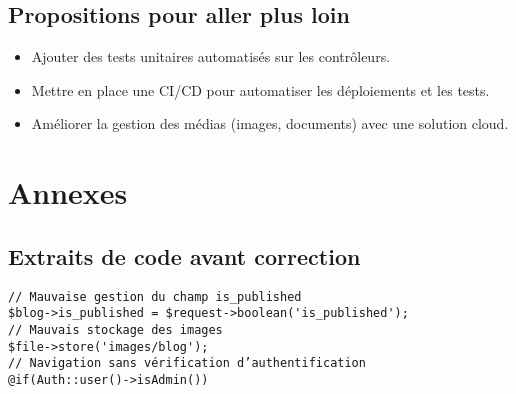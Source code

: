 \documentclass[a4paper,12pt]{report}
\begin{document}
\subsection{Propositions pour aller plus loin}
\begin{itemize}
    \item Ajouter des tests unitaires automatisés sur les contrôleurs.
    \item Mettre en place une CI/CD pour automatiser les déploiements et les tests.
    \item Améliorer la gestion des médias (images, documents) avec une solution cloud.
\end{itemize}

\section*{Annexes}

\subsection*{Extraits de code avant correction}
\label{annexe:extraits_code}
\begin{verbatim}
// Mauvaise gestion du champ is_published
$blog->is_published = $request->boolean('is_published');
// Mauvais stockage des images
$file->store('images/blog');
// Navigation sans vérification d’authentification
@if(Auth::user()->isAdmin())
\end{verbatim}
\end{document}
